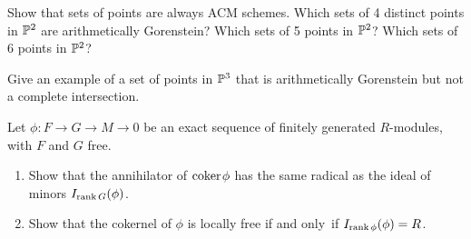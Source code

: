 \begin{exercise}
Show that sets of points are always ACM schemes. 
%
Which sets of 4 distinct points in ${\mathbb P}^2$ are arithmetically
Gorenstein? Which sets of 5 points in ${\mathbb P}^2$? Which sets of 6 points in ${\mathbb P}^2$?
\end{exercise}

\begin{exercise}
Give an example of a set of points in ${\mathbb P}^3$ that is arithmetically
%
Gorenstein but not a complete intersection.
\end{exercise}

\begin{exercise}
\label{Fitt}
Let $\phi: F\to G \to M\to 0$ be an exact sequence of finitely generated
$R$-modules,
with $F$ and $G$ free.

\begin{enumerate}
\item Show that the annihilator of  ${\rm{coker}\kern1pt} \phi$ has the
same radical as the ideal 
of minors
$I_{\operatorname{rank} G}(\phi)$.
\item 
Show that the cokernel of $\phi$
is locally free if and only~if $I_{\operatorname{rank} \phi}(\phi)= R$.
\end{enumerate}
\end{exercise}



